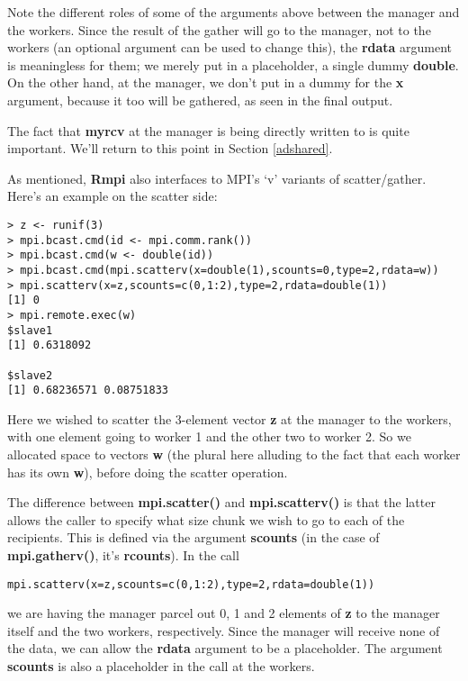 Note the different roles of some of the arguments above between the
manager and the workers.  Since the result of the gather will go to the
manager, not to the workers (an optional argument can be used to change
this), the {\bf rdata} argument is meaningless for them; we merely put
in a placeholder, a single dummy {\bf double}.  On the other hand, at
the manager, we don't put in a dummy for the {\bf x} argument, because
it too will be gathered, as seen in the final output.

The fact that {\bf myrcv} at the manager is being directly written to is
quite important.  We'll return to this point in Section \ref{adshared}.

As mentioned, {\bf Rmpi} also interfaces to MPI's `v' variants of
scatter/gather.  Here's an example on the scatter side:

\begin{lstlisting}
> z <- runif(3)
> mpi.bcast.cmd(id <- mpi.comm.rank())
> mpi.bcast.cmd(w <- double(id))
> mpi.bcast.cmd(mpi.scatterv(x=double(1),scounts=0,type=2,rdata=w))
> mpi.scatterv(x=z,scounts=c(0,1:2),type=2,rdata=double(1))
[1] 0
> mpi.remote.exec(w)
$slave1
[1] 0.6318092

$slave2
[1] 0.68236571 0.08751833
\end{lstlisting}

Here we wished to scatter the 3-element vector {\bf z} at the manager to
the workers, with one element going to worker 1 and the other two to
worker 2.  So we allocated space to vectors {\bf w} (the plural here
alluding to the fact that each worker has its own {\bf w}), before doing
the scatter operation.

The difference between {\bf mpi.scatter()} and {\bf mpi.scatterv()} is
that the latter allows the caller to specify what size chunk we wish to
go to each of the recipients.  This is defined via the argument {\bf
scounts} (in the case of {\bf mpi.gatherv()}, it's {\bf rcounts}).  In
the call

\begin{lstlisting}
mpi.scatterv(x=z,scounts=c(0,1:2),type=2,rdata=double(1))
\end{lstlisting}

we are having the manager parcel out 0, 1 and 2 elements of {\bf z} to
the manager itself and the two workers, respectively.  Since the manager
will receive none of the data, we can allow the {\bf rdata} argument to
be a placeholder.  The argument {\bf scounts} is also a placeholder in
the call at the workers.

